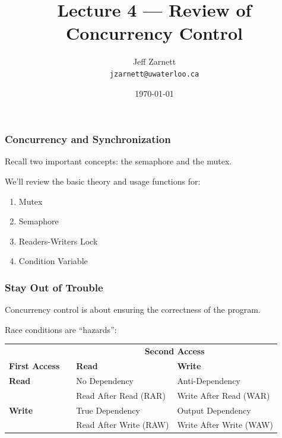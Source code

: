 


\title{Lecture 4 --- Review of Concurrency Control }

\author{Jeff Zarnett \\ \small \texttt{jzarnett@uwaterloo.ca}}
\date{\today}




\begin{frame}
  \titlepage

 \end{frame}

\begin{frame}
\frametitle{Concurrency and Synchronization}

Recall two important concepts: the semaphore and the mutex.

We'll review the basic theory and usage functions for:

\begin{enumerate}
	\item Mutex
	\item Semaphore
	\item Readers-Writers Lock
	\item Condition Variable
\end{enumerate}

\end{frame}

\begin{frame}
\frametitle{Stay Out of Trouble}

Concurrency control is about ensuring the correctness of the program.

Race conditions are ``hazards'':

\begin{center}
\begin{tabular}{ll|l|l}
	& & \multicolumn{2}{c}{\textbf{Second Access}} \\
\textbf{First Access}	& & \textbf{Read} & \textbf{Write} \\ \hline
\textbf{Read}	& & No Dependency & Anti-Dependency \\
	& & Read After Read (RAR) & Write After Read (WAR) \\\hline
\textbf{Write}	& & True Dependency & Output Dependency \\
	& & Read After Write (RAW) & Write After Write (WAW) \\
\end{tabular}
\end{center}

\end{frame}

